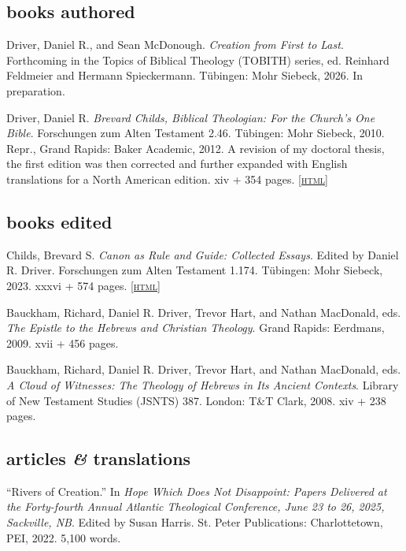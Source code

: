 \documentclass[11pt]{article}
\newcommand{\amper}{\emph{\&}}
\newcommand{\html}[1]{\href{#1}{\footnotesize\textsc{[html]}}}
\newcommand{\years}[1]{\marginnote{\footnotesize #1}}
\begin{document}
\subsection*{books authored}

\years{2026}
Driver, Daniel R., and Sean McDonough. \emph{Creation from First to Last}. Forthcoming in the Topics of Biblical Theology (TOBITH) series, ed. Reinhard Feldmeier and Hermann Spieckermann. Tübingen: Mohr Siebeck, 2026. In preparation.

\years{2010, 2012}
Driver, Daniel R. \emph{Brevard Childs, Biblical Theologian: For the Church’s One Bible}. Forschungen zum Alten Testament 2.46. Tübingen: Mohr Siebeck, 2010. Repr., Grand Rapids: Baker Academic, 2012. A revision of my doctoral thesis, the first edition was then corrected and further expanded with English translations for a North American edition. xiv + 354 pages. %
\html{http://danieldriver.com/bsc/}

\subsection*{books edited}

\years{2023}
Childs, Brevard S. \emph{Canon as Rule and Guide: Collected Essays}. Edited by Daniel R. Driver. Forschungen zum Alten Testament 1.174. Tübingen: Mohr Siebeck, 2023. xxxvi + 574 pages.
\html{http://danieldriver.com/bsc/}

\years{2009}
Bauckham, Richard, Daniel R. Driver, Trevor Hart, and Nathan MacDonald, eds. \emph{The Epistle to the Hebrews and Christian Theology}. Grand Rapids: Eerdmans, 2009. xvii + 456 pages. %

\years{2008}
Bauckham, Richard, Daniel R. Driver, Trevor Hart, and Nathan MacDonald, eds. \emph{A Cloud of Witnesses: The Theology of Hebrews in Its Ancient Contexts}. Library of New Testament Studies (JSNTS) 387. London: T\&T Clark, 2008. xiv + 238 pages. %

\subsection*{articles \amper{} translations}

\years{2026}
``Rivers of Creation.'' In \emph{Hope Which Does Not Disappoint: Papers Delivered at the Forty-fourth Annual Atlantic Theological Conference, June 23 to 26, 2025, Sackville, NB}. Edited by Susan Harris. St. Peter Publications: Charlottetown, PEI, 2022. 5,100 words.
\end{document}
